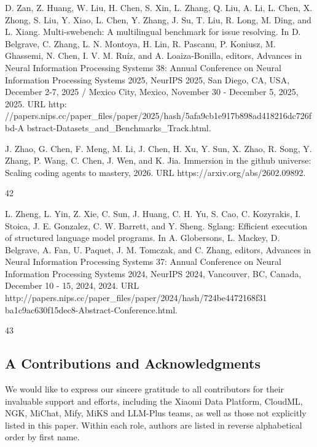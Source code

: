 \documentclass[
  10
]{article}
\begin{document}
D. Zan, Z. Huang, W. Liu, H. Chen, S. Xin, L. Zhang, Q. Liu, A. Li, L.
Chen, X. Zhong, S. Liu, Y. Xiao, L. Chen, Y. Zhang, J. Su, T. Liu, R.
Long, M. Ding, and L. Xiang. Multi-swebench: A multilingual benchmark
for issue resolving. In D. Belgrave, C. Zhang, L. N. Montoya, H. Lin, R.
Pascanu, P. Koniusz, M. Ghassemi, N. Chen, I. V. M. Ruíz, and A.
Loaiza-Bonilla, editors, Advances in Neural Information Processing
Systems 38: Annual Conference on Neural Information Processing Systems
2025, NeurIPS 2025, San Diego, CA, USA, December 2-7, 2025 / Mexico
City, Mexico, November 30 - December 5, 2025, 2025. URL http:
//papers.nips.cc/paper\_files/paper/2025/hash/5afa9cb1e917b898ad418216dc726fbd-A
bstract-Datasets\_and\_Benchmarks\_Track.html.

J. Zhao, G. Chen, F. Meng, M. Li, J. Chen, H. Xu, Y. Sun, X. Zhao, R.
Song, Y. Zhang, P. Wang, C. Chen, J. Wen, and K. Jia. Immersion in the
github universe: Scaling coding agents to mastery, 2026. URL
https://arxiv.org/abs/2602.09892.

42

L. Zheng, L. Yin, Z. Xie, C. Sun, J. Huang, C. H. Yu, S. Cao, C.
Kozyrakis, I. Stoica, J. E. Gonzalez, C. W. Barrett, and Y. Sheng.
Sglang: Efficient execution of structured language model programs. In A.
Globersons, L. Mackey, D. Belgrave, A. Fan, U. Paquet, J. M. Tomczak,
and C. Zhang, editors, Advances in Neural Information Processing Systems
37: Annual Conference on Neural Information Processing Systems 2024,
NeurIPS 2024, Vancouver, BC, Canada, December 10 - 15, 2024, 2024. URL
http://papers.nips.cc/paper\_files/paper/2024/hash/724be4472168f31
ba1c9ac630f15dec8-Abstract-Conference.html.

43

\subsection{A Contributions and
Acknowledgments}\label{a-contributions-and-acknowledgments}

We would like to express our sincere gratitude to all contributors for
their invaluable support and efforts, including the Xiaomi Data Platform,
CloudML, NGK, MiChat, Mify, MiKS and LLM-Plus teams, as well as those
not explicitly listed in this paper. Within each role, authors are
listed in reverse alphabetical order by first name.
\end{document}
